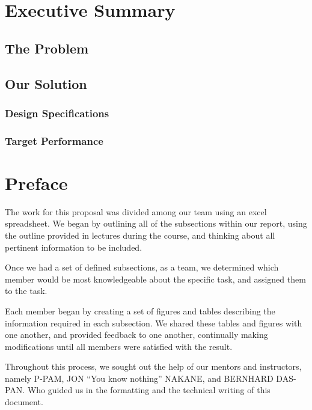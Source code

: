 \documentclass[12pt]{article}
\begin{document}
\begin{titlingpage}
\maketitle
\begin{abstract}
\end{abstract}
\end{titlingpage}

\tableofcontents
\section{Executive Summary}
\subsection{The Problem}
\subsection{Our Solution}
\subsubsection{Design Specifications}
\subsubsection{Target Performance}


\section{Preface}
\par The work for this proposal was divided among our team using an excel spreadsheet. We began by outlining all of the subsections within our report, using the outline provided in lectures during the course, and thinking about all pertinent information to be included. \\ \par
Once we had a set of defined subsections, as a team, we determined which member would be most knowledgeable about the specific task, and assigned them to the task. \\ \par
Each member began by creating a set of figures and tables describing the information required in each subsection. We shared these tables and figures with one another, and provided feedback to one another, continually making modifications until all members were satisfied with the result. \\ \par
Throughout this process, we sought out the help of our mentors and instructors, namely P-PAM, JON “You know nothing” NAKANE, and BERNHARD DAS-PAN. Who guided us in the formatting and the technical writing of this document. \\
\end{document}
